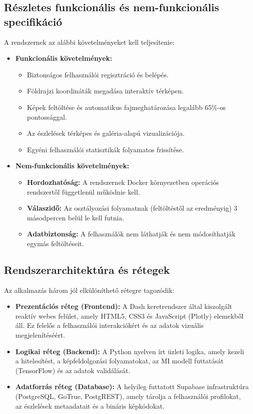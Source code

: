 \documentclass[
	parspace, %
]{elteikthesis}[2024/04/26]
\begin{document}
\subsection{Részletes funkcionális és nem-funkcionális specifikáció}
A rendszernek az alábbi követelményeket kell teljesítenie:
\begin{itemize}
    \item \textbf{Funkcionális követelmények:}
    \begin{itemize}
        \item Biztonságos felhasználói regisztráció és belépés.
        \item Földrajzi koordináták megadása interaktív térképen.
        \item Képek feltöltése és automatikus fajmeghatározása legalább 65\%-os pontossággal.
        \item Az észlelések térképes és galéria-alapú vizualizációja.
        \item Egyéni felhasználói statisztikák folyamatos frissítése.
    \end{itemize}
    \item \textbf{Nem-funkcionális követelmények:}
    \begin{itemize}
        \item \textbf{Hordozhatóság:} A rendszernek Docker környezetben operációs rendszertől függetlenül működnie kell.
        \item \textbf{Válaszidő:} Az osztályozási folyamatnak (feltöltéstől az eredményig) 3 másodpercen belül le kell futnia.
        \item \textbf{Adatbiztonság:} A felhasználók nem láthatják és nem módosíthatják egymás feltöltéseit.
    \end{itemize}
\end{itemize}

\subsection{Rendszerarchitektúra és rétegek}
Az alkalmazás három jól elkülöníthető rétegre tagozódik:
\begin{itemize}
    \item \textbf{Prezentációs réteg (Frontend):} A Dash keretrendszer által kiszolgált reaktív webes felület, amely HTML5, CSS3 és JavaScript (Plotly) elemekből áll. Ez felelős a felhasználói interakciókért és az adatok vizuális megjelenítéséért.
    \item \textbf{Logikai réteg (Backend):} A Python nyelven írt üzleti logika, amely kezeli a hitelesítést, a képfeldolgozási folyamatokat, az MI modell futtatását (TensorFlow) és az adatok validálását.
    \item \textbf{Adatforrás réteg (Database):} A helyileg futtatott Supabase infrastruktúra (PostgreSQL, GoTrue, PostgREST), amely tárolja a felhasználói profilokat, az észlelések metaadatait és a bináris képkódokat.
\end{itemize}
\end{document}
